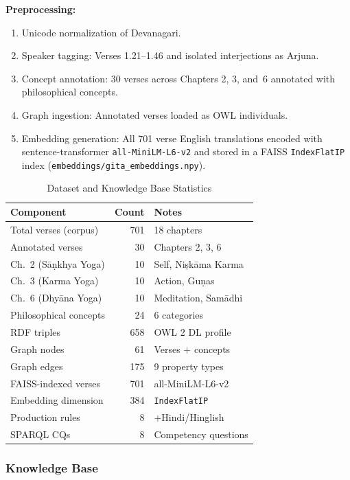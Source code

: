 \documentclass[conference]{IEEEtran}
\begin{document}
\textbf{Preprocessing:}
\begin{enumerate}[leftmargin=*]
  \item Unicode normalization of Devanagari.
  \item Speaker tagging: Verses 1.21--1.46 and isolated interjections as Arjuna.
  \item Concept annotation: 30 verses across Chapters 2, 3, and~6 annotated
        with philosophical concepts.
  \item Graph ingestion: Annotated verses loaded as OWL individuals.
  \item Embedding generation: All 701 verse English translations encoded with
        sentence-transformer \texttt{all-MiniLM-L6-v2} and stored in a FAISS
        \texttt{IndexFlatIP} index (\texttt{embeddings/gita\_embeddings.npy}).
\end{enumerate}

\begin{table}[!t]
\caption{Dataset and Knowledge Base Statistics}
\label{tab:dataset}
\centering
\small
\begin{tabular}{@{}l r p{3.0cm}@{}}
\toprule
\textbf{Component} & \textbf{Count} & \textbf{Notes} \\
\midrule
Total verses (corpus) & 701 & 18 chapters \\
Annotated verses & 30 & Chapters 2, 3, 6 \\
\quad Ch.~2 (S\={a}\d{n}khya Yoga) & 10 & Self, Ni\d{s}k\={a}ma Karma \\
\quad Ch.~3 (Karma Yoga) & 10 & Action, Gu\d{n}as \\
\quad Ch.~6 (Dhy\={a}na Yoga) & 10 & Meditation, Sam\={a}dhi \\
Philosophical concepts & 24 & 6 categories \\
RDF triples & 658 & OWL 2 DL profile \\
Graph nodes & 61 & Verses + concepts \\
Graph edges & 175 & 9 property types \\
FAISS-indexed verses & 701 & all-MiniLM-L6-v2 \\
Embedding dimension & 384 & \texttt{IndexFlatIP} \\
Production rules & 8 & +Hindi/Hinglish \\
SPARQL CQs & 8 & Competency questions \\
\bottomrule
\end{tabular}
\end{table}

\subsubsection{Knowledge Base}
\end{document}
